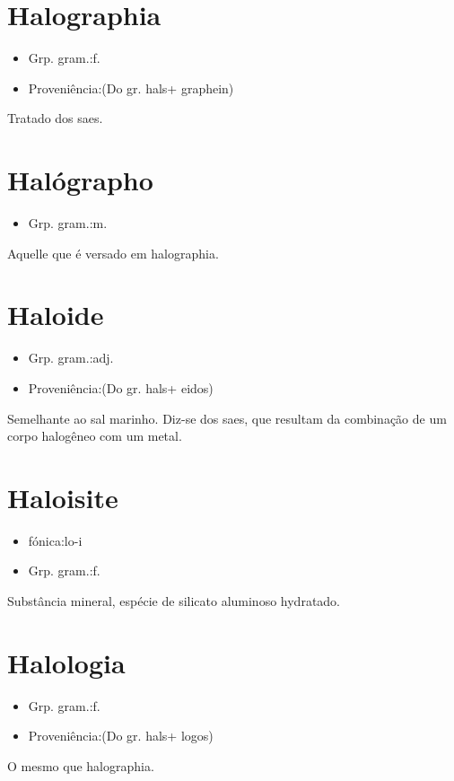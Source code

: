 \documentclass{article}
\begin{document}
\section{Halographia}
\begin{itemize}
\item {Grp. gram.:f.}
\end{itemize}
\begin{itemize}
\item {Proveniência:(Do gr. \textunderscore hals\textunderscore  + \textunderscore graphein\textunderscore )}
\end{itemize}
Tratado dos saes.
\section{Halógrapho}
\begin{itemize}
\item {Grp. gram.:m.}
\end{itemize}
Aquelle que é versado em halographia.
\section{Haloide}
\begin{itemize}
\item {Grp. gram.:adj.}
\end{itemize}
\begin{itemize}
\item {Proveniência:(Do gr. \textunderscore hals\textunderscore  + \textunderscore eidos\textunderscore )}
\end{itemize}
Semelhante ao sal marinho.
Diz-se dos saes, que resultam da combinação de um corpo halogêneo com um metal.
\section{Haloisite}
\begin{itemize}
\item {fónica:lo-i}
\end{itemize}
\begin{itemize}
\item {Grp. gram.:f.}
\end{itemize}
Substância mineral, espécie de silicato aluminoso hydratado.
\section{Halologia}
\begin{itemize}
\item {Grp. gram.:f.}
\end{itemize}
\begin{itemize}
\item {Proveniência:(Do gr. \textunderscore hals\textunderscore  + \textunderscore logos\textunderscore )}
\end{itemize}
O mesmo que \textunderscore halographia\textunderscore .
\end{document}
